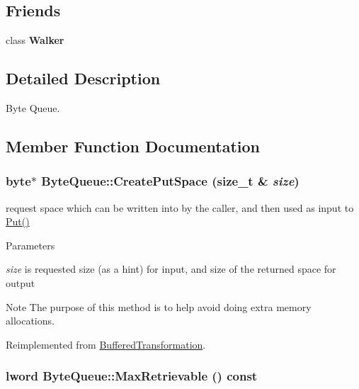 \subsection*{Friends}
\begin{DoxyCompactItemize}
\item 
\hypertarget{class_byte_queue_a561951adc2bae72717df4b975c66f02f}{
class {\bfseries Walker}}
\label{class_byte_queue_a561951adc2bae72717df4b975c66f02f}

\end{DoxyCompactItemize}


\subsection{Detailed Description}
Byte Queue. 

\subsection{Member Function Documentation}
\hypertarget{class_byte_queue_a144c8bb417fc6c9631ae979ce7b7d52a}{
\subsubsection[{CreatePutSpace}]{\setlength{\rightskip}{0pt plus 5cm}byte$\ast$ ByteQueue::CreatePutSpace (size\_\-t \& {\em size})}}
\label{class_byte_queue_a144c8bb417fc6c9631ae979ce7b7d52a}


request space which can be written into by the caller, and then used as input to \hyperlink{class_buffered_transformation_ae70658b0d271f8e114ac6c3cc9774ede}{Put()} 
\begin{DoxyParams}{Parameters}
\item[{\em size}]is requested size (as a hint) for input, and size of the returned space for output\end{DoxyParams}
\begin{DoxyNote}{Note}
The purpose of this method is to help avoid doing extra memory allocations. 
\end{DoxyNote}


Reimplemented from \hyperlink{class_buffered_transformation_af390325c959c3d6a2c03a447d6cd469d}{BufferedTransformation}.\hypertarget{class_byte_queue_a56f851da4a1e9518c2b7005807aecab8}{
\subsubsection[{MaxRetrievable}]{\setlength{\rightskip}{0pt plus 5cm}lword ByteQueue::MaxRetrievable () const}}
\label{class_byte_queue_a56f851da4a1e9518c2b7005807aecab8}


